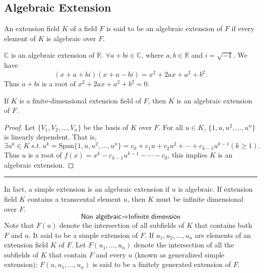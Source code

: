 \subsection{Algebraic Extension}

\begin{definition}
    An extension field $K$ of a field $F$ is said to be an algebraic extension of $F$ if every element 
    of $K$ is algebraic over $F$. 
\end{definition}

\begin{example}
    $\mathbb{C}$ is an algebraic extension of $\mathbb{R}$. $\forall a+bi \in \mathbb{C}$, where 
    $a,b \in \mathbb{R}$ and $i = \sqrt{-1}$. We have 
    \[
        (x+a+bi)(x+a-bi) = x^2 +2ax + a^2 + b^2.
    \]
    Thus $a+bi$ is a root of $x^2 +2ax + a^2 + b^2 = 0$.
\end{example}

\begin{theorem}
    If $K$ is a finite-dimensional extension field of $F$, then $K$ is an algebraic extension of $F$.
\end{theorem}
\begin{proof}
    Let $\{ V_1, V_2, \ldots, V_n \}$ be the basis of $K$ over $F$. For all $u \in K$, 
    $\{ 1, u, u^2, \ldots, u^n \}$ is linearly dependent. That is, 
    \[
        \exists u^k \in K \> s.t. \> u^k = \text{Span} \{1, u, u^2, \ldots, u^n\} = c_0 + c_1 u + c_2 u^2 +
        \cdots + c_{k-1} u^{k-1} (k \geq 1).
    \]
    Thus $u$ is a root of $f(x) = x^k - c_{k-1} u^{k-1} - \cdots - c_0$, this implies $K$ is an algebraic extension.
\end{proof}

\hrule
\vspace{10pt}

In fact, a simple extension is an algebraic extension if $u$ is algebraic. If extension field $K$ contains a 
transcental element $u$, then $K$ must be infinite dimensional over $F$.
\[
    \textsf{Non algebraic} \Longrightarrow \textsf{Infinite dimension}
\]
Note that $F(u)$ denote the intersection of all subfields of $K$ that contains both $F$ and $u$. It said to be a simple 
extension of $F$. If $u_1, u_2, \ldots, u_n$ are elements of an extension field $K$ of $F$. Let 
$F(u_1, \ldots, u_n)$ denote the intersection of all the subfields of $K$ that contain $F$ and every $u$ (known as 
generalized simple extension); $F(u, u_1, \ldots, u_n)$ is said to be a finitely generated extension of $F$.

